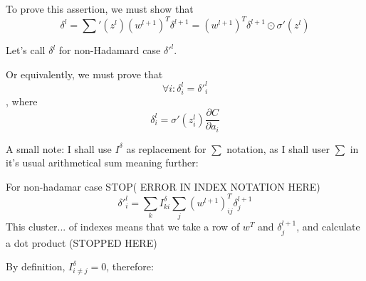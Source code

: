 \documentclass{article}
\begin{document}
To prove this assertion, we must show that 
$$\delta^l = {\sum}'(z^l) (w^{l+1})^{T} \delta^{l+1} = (w^{l+1})^{T} \delta^{l+1}\odot\sigma'(z^l)$$

Let's call $\delta^l$ for non-Hadamard case $\delta'^l$.

Or equivalently, we must prove that $$\forall i: \delta^l_i = \delta'^l_i$$,
where $$\delta^l_i = \sigma'(z_i^l)\frac{\partial C}{\partial a_i}$$

A small note: I shall use $I^{\delta}$ as replacement for $\sum$ notation, as I shall user $\sum$ in it's usual arithmetical sum meaning further:

For non-hadamar case
STOP( ERROR IN INDEX NOTATION HERE)
$$\delta'^l_i = \sum_k I^{\delta}_{ki} \sum_j(w^{l+1})^T_{ij} \delta^{l+1}_j$$
This cluster... of indexes means that we take a row of $w^T$ and $\delta^{l+1}_j$, and calculate a dot product
(STOPPED HERE)

By definition, $I^{\delta}_{i \neq j} = 0$, therefore:
\end{document}
